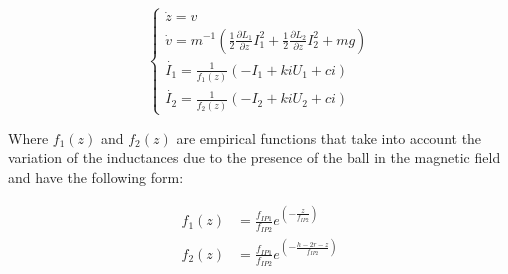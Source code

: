 \begin{equation}
    \begin{cases}
        \dot{z} = v                                                                                                                                 \\
        \dot{v} = m^{-1} \left(\frac{1}{2} \frac{\partial L_1}{\partial z} I_1^2 + \frac{1}{2} \frac{\partial L_2}{\partial z} I_2^2 + m g  \right) \\
        \dot{I_1} = \frac{1}{f_1(z)} \left(- I_1 + ki U_1 + ci \right)                                                                              \\
        \dot{I_2} = \frac{1}{f_2(z)} \left(- I_2 + ki U_2 + ci \right)
    \end{cases}
    \label{eq:simplified_equations_of_motion_final}
\end{equation}

Where $f_1(z)$ and $f_2(z)$ are empirical functions that take into account the variation of the inductances due to the presence of the ball in the magnetic field and have the following form:

\begin{equation}
    \begin{aligned}
        f_1(z) & = \frac{f_{IP1}}{f_{IP2}} e^{\left(-\frac{z}{f_{IP2}}\right)}          \\
        f_2(z) & = \frac{f_{IP1}}{f_{IP2}} e^{\left(-\frac{h - 2r - z}{f_{IP2}}\right)}
    \end{aligned}
\end{equation}
